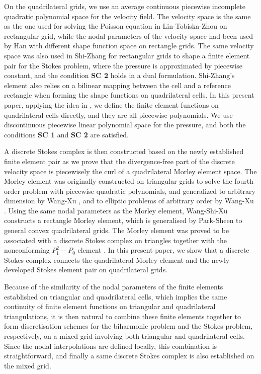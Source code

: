 \documentclass[12pt,showkeys]{amsart}
\begin{document}
On the quadrilateral grids, we use an average continuous piecewise incomplete quadratic polynomial space for the velocity field. The velocity space is the same as the one  used for solving the Poisson equation in Lin-Tobiska-Zhou \cite{Lin.Q;Tobiska.L;Zhou.A2005} on rectangular grid, while the nodal parameters of the velocity space had been used by Han \cite{Han.H1984} with different shape function space on rectangle grids. The same velocity space was also used in Shi-Zhang \cite{Shi.D;Zhang.Y2006} for rectangular grids to shape a finite element pair for the Stokes problem, where the pressure is approximated by piecewise constant, and the condition \textbf{SC 2} holds in a dual formulation. Shi-Zhang's element also relies on a bilinear mapping between the cell and a reference rectangle when forming the shape functions on quadrilateral cells. In this present paper, applying the idea in \cite{Park.C;Sheen.D2013}, we define the finite element functions on quadrilateral cells directly, and they are all piecewise polynomials. We use discontinuous piecewise linear polynomial space for the pressure, and both the conditions \textbf{SC 1} and \textbf{SC 2} are satisfied.

A discrete Stokes complex is then constructed based on the newly established finite element pair as we prove that the divergence-free part of the discrete velocity space is piecewisely the curl of a quadrilateral Morley element space. The Morley element was originally constructed on triangular grids to solve the fourth order problem with piecewise quadratic polynomials\cite{Morley.L1968}, and generalized to arbitrary dimension by Wang-Xu \cite{Wang.M;Xu.J2006}, and to elliptic problems of arbitrary order by Wang-Xu \cite{WangXu2012}. Using the same nodal parameters as the Morley element, Wang-Shi-Xu\cite{Wang.M;Shi.Z;Xu.J2007} constructs a rectangle Morley element, which is generalised by Park-Sheen \cite{Park.C;Sheen.D2013} to general convex quadrilateral grids. The Morley element was proved to be associated with a discrete Stokes complex on triangles together with the nonconforming $P_1^2-P_0$ element \cite{Falk.R;Morley.E1990,Feng.C;Xu.J;Zhang.S2013}.  In this present paper, we show that a discrete Stokes complex connects the quadrilateral Morley element and the newly-developed Stokes element pair on quadrilateral grids. 

Because of the similarity of the nodal parameters of the finite elements established on triangular and quadrilateral cells, which implies the same continuity of finite element functions on triangular and quadrilateral triangulations, it is then natural to combine these finite elements together to form discretisation schemes for the biharmonic problem and the Stokes problem, respectively, on a mixed grid involving both triangular and quadrilateral cells. Since the nodal interpolations are defined locally, this combination is straightforward, and finally a same discrete Stokes complex is also established on the mixed grid.
\end{document}
